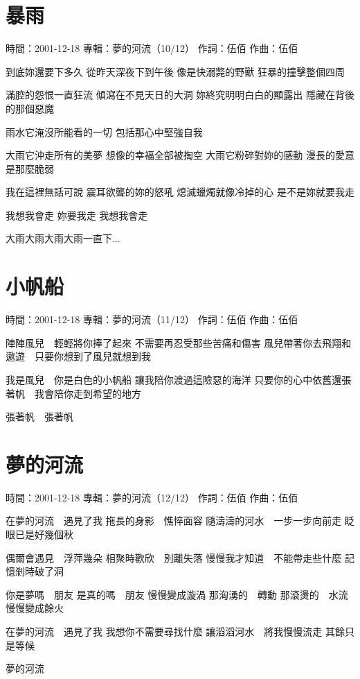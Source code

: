 \documentclass[UTF8,a4paper,oneside,twocolumn,12pt]{ctexbook}
\newcommand{\infopair}[2]{\textbullet #1：#2}
\newcommand{\zc}[1][伍佰]{\infopair{作詞}{#1}}
\newcommand{\zq}[1][伍佰]{\infopair{作曲}{#1}}
\newcommand{\zj}[1]{\infopair{專輯}{#1}}
\newcommand{\sj}[1]{\infopair{時間}{#1}}
\newenvironment{info}{\begin{flushleft}\kaishu
	}
	{\end{flushleft}\normalsize\yahei\par}
\newenvironment{lyric}{
	}
{}
\begin{document}
\section{暴雨}
\begin{info}
	\sj{2001-12-18}
	\zj{夢的河流（10/12）}
	\zc
	\zq
\end{info}
\begin{lyric}
	到底妳還要下多久
	從昨天深夜下到午後
	像是快溺斃的野獸
	狂暴的撞擊整個四周

	滿腔的怨恨一直狂流
	傾瀉在不見天日的大洞
	妳終究明明白白的顯露出
	隱藏在背後的那個惡魔

	雨水它淹沒所能看的一切
	包括那心中堅強自我

	大雨它沖走所有的美夢
	想像的幸福全部被掏空
	大雨它粉碎對妳的感動
	漫長的愛意是那麼脆弱

	我在這裡無話可說
	震耳欲聾的妳的怒吼
	熄滅蠟燭就像冷掉的心
	是不是妳就要我走

	我想我會走
	妳要我走
	我想我會走

	大雨大雨大雨大雨一直下...
\end{lyric}

\section{小帆船}
\begin{info}
	\sj{2001-12-18}
	\zj{夢的河流（11/12）}
	\zc
	\zq
\end{info}
\begin{lyric}
	陣陣風兒　輕輕將你捧了起來
	不需要再忍受那些苦痛和傷害
	風兒帶著你去飛翔和遨遊　只要你想到了風兒就想到我

	我是風兒　你是白色的小帆船
	讓我陪你渡過這險惡的海洋
	只要你的心中依舊還張著帆　我會陪你走到希望的地方

	張著帆　張著帆
\end{lyric}

\section{夢的河流}
\begin{info}
	\sj{2001-12-18}
	\zj{夢的河流（12/12）}
	\zc
	\zq
\end{info}
\begin{lyric}
	在夢的河流　遇見了我
	拖長的身影　憔悴面容
	隨濤濤的河水　一步一步向前走
	眨眼已是好幾個秋

	偶爾會遇見　浮萍幾朵
	相聚時歡欣　別離失落
	慢慢我才知道　不能帶走些什麼
	記憶剎時破了洞

	你是夢嗎　朋友
	是真的嗎　朋友
	慢慢變成漩渦
	那洶湧的　轉動
	那滾燙的　水流
	慢慢變成餘火

	在夢的河流　遇見了我
	我想你不需要尋找什麼
	讓滔滔河水　將我慢慢流走
	其餘只是等候

	夢的河流
\end{lyric}
\end{document}
